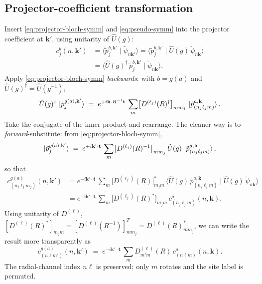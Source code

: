 \documentclass[11pt,a4paper]{article}
\newcommand{\kk}{\mathbf{k}}
\newcommand{\tvec}{\mathbf{t}}
\newcommand{\Uhat}{\hat{U}}
\begin{document}
\subsection{Projector-coefficient transformation}

Insert \eqref{eq:projector-bloch-symm} and \eqref{eq:pseudo-symm} into the
projector coefficient at $\kk'$, using unitarity of $\Uhat(g)$:
\begin{align}
c_j^{b}(n,\kk')
  &= \langle \tilde p_j^{b,\kk'} \mid \tilde\psi_{n\kk'}\rangle
   = \langle \tilde p_j^{b,\kk'} \mid \Uhat(g)\,\tilde\psi_{n\kk}\rangle \nonumber\\
  &= \langle \Uhat(g)^\dagger\,\tilde p_j^{b,\kk'} \mid \tilde\psi_{n\kk}\rangle.
\end{align}
Apply \eqref{eq:projector-bloch-symm} \emph{backwards}: with $b = g(a)$ and
$\Uhat(g)^\dagger = \Uhat(g^{-1})$,
\begin{equation}
\Uhat(g)^\dagger\,\ket{\tilde p_j^{g(a),\kk'}}
  \;=\; e^{+i\kk\cdot R^{-1}\tvec}\,\sum_{m} \bigl[D^{(\ell_j)}(R)^\dagger\bigr]_{m m_j}\,
        \ket{\tilde p_{(n_j\ell_j m)}^{a,\kk}}.
\end{equation}
Take the conjugate of the inner product and rearrange. The cleaner way is to
\emph{forward}-substitute: from \eqref{eq:projector-bloch-symm},
\begin{equation}
\ket{\tilde p_j^{g(a),\kk'}}
  \;=\; e^{+i\kk'\cdot\tvec}\,\sum_{m}
        \bigl[D^{(\ell_j)}(R)^{-1}\bigr]_{m m_j}\,
        \Uhat(g)\,\ket{\tilde p_{(n_j\ell_j m)}^{a,\kk}},
\end{equation}
so that
\begin{align}
c_{(n_j\ell_j m_j)}^{g(a)}(n,\kk')
  &= e^{-i\kk'\cdot\tvec}\,
     \sum_m \bigl[D^{(\ell_j)}(R)\bigr]_{m_j m}^{*}\,
     \langle \Uhat(g)\,\tilde p_{(n_j\ell_j m)}^{a,\kk}\mid\Uhat(g)\,\tilde\psi_{n\kk}\rangle \nonumber\\
  &= e^{-i\kk'\cdot\tvec}\,
     \sum_m \bigl[D^{(\ell_j)}(R)^{*}\bigr]_{m_j m}\,
     c_{(n_j\ell_j m)}^{a}(n,\kk).
\end{align}
Using unitarity of $D^{(\ell)}$, $[D^{(\ell)}(R)^*]_{m_j m} = [D^{(\ell)}(R^{-1})]_{m m_j}^{T}
 = D^{(\ell)}(R)_{m m_j}^{*}$, we can write the result more transparently as
\begin{equation}
\boxed{\;
c_{(n\ell m')}^{g(a)}(n,\kk')
  \;=\; e^{-i\kk'\cdot\tvec}\,
        \sum_m D^{(\ell)}_{m' m}(R)\,c_{(n\ell m)}^{a}(n,\kk).
\;}
\label{eq:coef-symm}
\end{equation}
The radial-channel index $n\ell$ is preserved; only $m$ rotates and the
site label is permuted.
\end{document}
